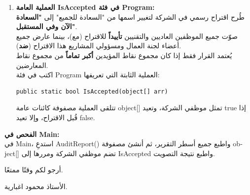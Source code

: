 \documentclass[14pt]{extarticle}
\begin{document}
\begin{enumerate}[resume, label=\textbf{تمرين \arabic*:}, wide=0pt, leftmargin=*, itemsep=2em]
\begin{enumerate}[label=\textbf{(\arabic*)}]
        \item \textbf{العملية العامة \textenglish{IsAccepted} في فئة \textenglish{Program}:} \\
        طُرح اقتراح رسمي في الشركة لتغيير اسمها من "السعادة للجميع" إلى \textbf{"السعادة الآن وفي المستقبل"}. \\
        صوّت جميع الموظفين العاديين والتقنيين \textbf{تأييداً} للاقتراح (مع)، بينما عارض جميع أعضاء لجنة العمال ومسؤولي المشاريع هذا الاقتراح (\textbf{ضد}). \\
        يُعتمد القرار فقط إذا كان مجموع نقاط المؤيدين \textbf{أكبر تماماً} من مجموع نقاط المعارضين. \\
        اكتب في فئة \textenglish{Program} العملية الثابتة التي تعريفها:
        \begin{boxCode}
        \begin{english}
        \begin{verbatim}
public static bool IsAccepted(object[] arr)
        \end{verbatim}
        \end{english}
        \end{boxCode}
        تتلقى العملية مصفوفة كائنات عامة \textenglish{object[]} تمثل موظفي الشركة، وتعيد \textenglish{true} إذا قُبل الاقتراح، وإلا تعيد \textenglish{false}.
    \end{enumerate}
    \textbf{الفحص في \textenglish{Main}:} \\
    في \textenglish{Main}، استدعِ \textenglish{AuditReport()} واطبع جميع أسطر التقرير، ثم أنشئ مصفوفة \textenglish{object[]} تضم موظفي الشركة ومررها إلى \textenglish{IsAccepted} واطبع نتيجة التصويت.

\end{enumerate}

\vspace{1cm}
\begin{flushleft}
أرجو لكم وقتًا ممتعًا.

الأستاذ محمود اغبارية.
\end{flushleft}
\end{document}

